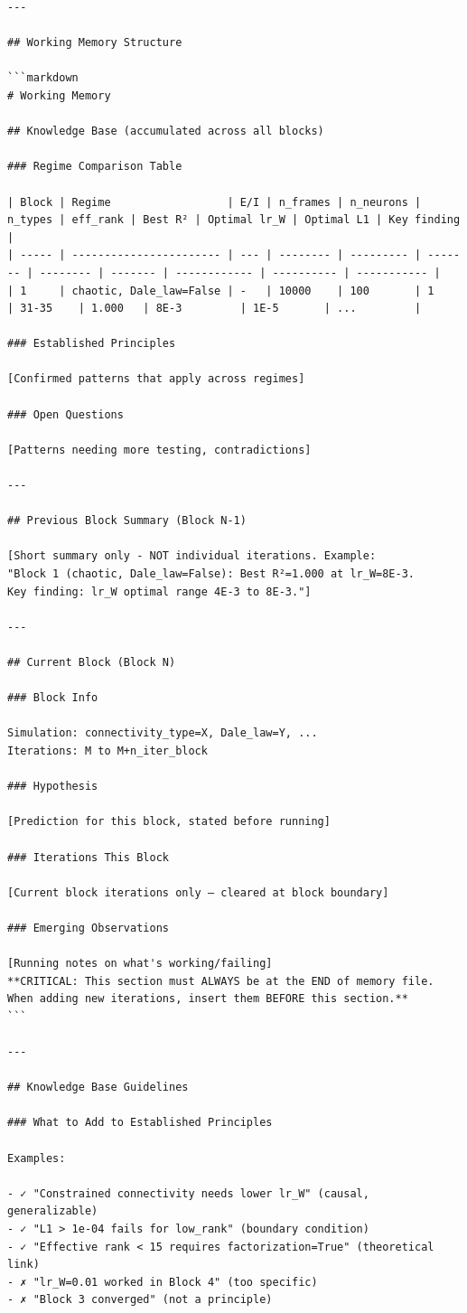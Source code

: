 \documentclass[10pt,twocolumn]{article}
\begin{document}
\begin{small}
\begin{verbatim}
---

## Working Memory Structure

```markdown
# Working Memory

## Knowledge Base (accumulated across all blocks)

### Regime Comparison Table

| Block | Regime                  | E/I | n_frames | n_neurons | n_types | eff_rank | Best R² | Optimal lr_W | Optimal L1 | Key finding |
| ----- | ----------------------- | --- | -------- | --------- | ------- | -------- | ------- | ------------ | ---------- | ----------- |
| 1     | chaotic, Dale_law=False | -   | 10000    | 100       | 1       | 31-35    | 1.000   | 8E-3         | 1E-5       | ...         |

### Established Principles

[Confirmed patterns that apply across regimes]

### Open Questions

[Patterns needing more testing, contradictions]

---

## Previous Block Summary (Block N-1)

[Short summary only - NOT individual iterations. Example:
"Block 1 (chaotic, Dale_law=False): Best R²=1.000 at lr_W=8E-3.
Key finding: lr_W optimal range 4E-3 to 8E-3."]

---

## Current Block (Block N)

### Block Info

Simulation: connectivity_type=X, Dale_law=Y, ...
Iterations: M to M+n_iter_block

### Hypothesis

[Prediction for this block, stated before running]

### Iterations This Block

[Current block iterations only — cleared at block boundary]

### Emerging Observations

[Running notes on what's working/failing]
**CRITICAL: This section must ALWAYS be at the END of memory file. When adding new iterations, insert them BEFORE this section.**
```

---

## Knowledge Base Guidelines

### What to Add to Established Principles

Examples:

- ✓ "Constrained connectivity needs lower lr_W" (causal, generalizable)
- ✓ "L1 > 1e-04 fails for low_rank" (boundary condition)
- ✓ "Effective rank < 15 requires factorization=True" (theoretical link)
- ✗ "lr_W=0.01 worked in Block 4" (too specific)
- ✗ "Block 3 converged" (not a principle)


\end{verbatim}
\end{small}
\end{document}
